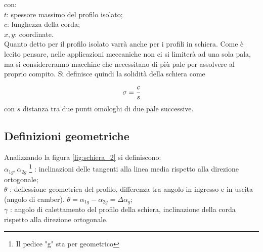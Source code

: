 con:\\[1mm]
$t$: spessore massimo del profilo isolato;\\
$c$: lunghezza della corda;\\
$x,y$: coordinate.\\[2mm]
Quanto detto per il profilo isolato varrà anche per i profili in schiera. Come è lecito pensare, nelle applicazioni meccaniche non ci si limiterà ad una sola pala, ma si considereranno macchine che necessitano di più pale per assolvere al proprio compito. Si definisce quindi la solidità della schiera come
\begin{equation}
\sigma = \cfrac{c}{s}
\end{equation}
con $s$ distanza tra due punti omologhi di due pale successive.
\subsection{Definizioni geometriche}
Analizzando la figura \ref{fig:schiera_2} si definiscono:\\[1mm]
$\alpha_{1g}, \alpha_{2g}$ \footnote{Il pedice "g" sta per geometrico} : inclinazioni delle tangenti alla linea media rispetto alla direzione ortogonale;\\
$\theta$ : deflessione geometrica del profilo, differenza tra angolo in ingresso e in uscita (angolo di camber). $\theta = \alpha_{1g} - \alpha_{2g} = \Delta \alpha_{g}$;\\
$\gamma$ : angolo di calettamento del profilo della schiera, inclinazione della corda rispetto alla direzione ortogonale.\\
